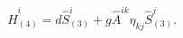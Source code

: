 \begin{equation}
\hat H_{(4)}^i=d\hat S_{(3)}^i+g\hat A^{ik}\eta_{kj}\hat S_{(3)}^j.
\end{equation}

